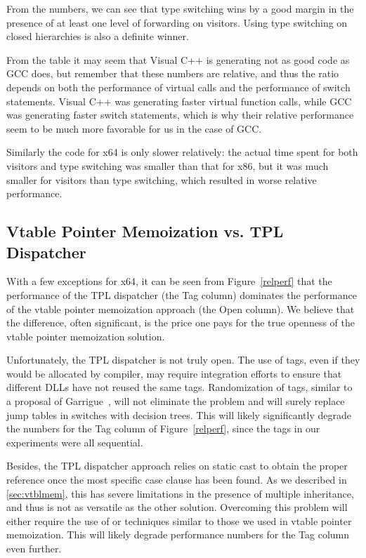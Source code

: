 From the numbers, we can see that type switching wins by a good margin in 
the presence of at least one level of forwarding on visitors. Using type 
switching on closed hierarchies is also a definite winner.

From the table it may seem that Visual C++ is generating not as good code as GCC 
does, but remember that these numbers are relative, and thus the ratio depends on  
both the performance of virtual calls and the performance of switch statements. Visual 
C++ was generating faster virtual function calls, while GCC was generating 
faster switch statements, which is why their relative performance seem to be much 
more favorable for us in the case of GCC.

Similarly the code for x64 is only slower relatively: the actual time spent for 
both visitors and type switching was smaller than that for x86, but it was much 
smaller for visitors than type switching, which resulted in worse relative 
performance.

\subsection{Vtable Pointer Memoization vs. TPL Dispatcher}
\label{sec:cmp}

With a few exceptions for x64, it can be seen from Figure~\ref{relperf} 
that the performance of the TPL dispatcher (the Tag column) dominates the 
performance of the vtable pointer memoization approach (the Open column). We believe 
that the difference, often significant, is the price one pays for the true 
openness of the vtable pointer memoization solution.

Unfortunately, the TPL dispatcher is not truly open. The use of tags, 
even if they would be allocated by compiler, may require integration efforts to 
ensure that different DLLs have not reused the same tags. Randomization of tags,
similar to a proposal of Garrigue~\cite{garrigue-98}, will not eliminate the 
problem and will surely replace jump tables in switches with decision trees. This 
will likely significantly degrade the numbers for the Tag column of 
Figure~\ref{relperf}, since the tags in our experiments were all sequential.

Besides, the TPL dispatcher approach relies on static cast to obtain the 
proper reference once the most specific case clause has been found. As we 
described in \textsection\ref{sec:vtblmem}, this has severe limitations in the 
presence of multiple inheritance, and thus is not as versatile as the other 
solution. Overcoming this problem will either require the use of 
 or techniques similar to those we used in vtable pointer 
memoization. This will likely degrade performance numbers for the Tag column even further.

